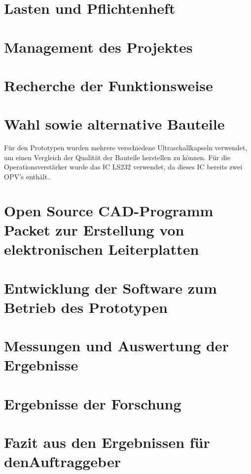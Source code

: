 \documentclass [11pt,a4paper,bibliography=totoc]{scrreprt}%
\begin{document}
\thispagestyle{empty}

\newpage
\thispagestyle{empty}

\setcounter{page}{0}
\newpage 
{} 
\tableofcontents 
\newpage
\newpage
\setcounter{page}{0}

\chapter{Lasten und Pflichtenheft}

\chapter{Management des Projektes}

\chapter{Recherche der Funktionsweise}

\chapter{Wahl sowie alternative Bauteile}
Für den Prototypen wurden mehrere verschiedene Ultraschallkapseln verwendet, um einen Vergleich der Qualität der Bauteile herstellen zu können. Für die Operationsverstärker wurde das IC LS232 verwendet, da dieses IC bereits zwei OPV's enthält.
\chapter{Open Source CAD-Programm Packet zur Erstellung von elektronischen Leiterplatten}

\chapter{Entwicklung der Software zum Betrieb des Prototypen}

\chapter{Messungen und Auswertung der Ergebnisse}

\chapter{Ergebnisse der Forschung}

\chapter{Fazit aus den Ergebnissen für denAuftraggeber}

\end{document}

